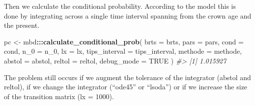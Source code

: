 \documentclass[]{article}
\newenvironment{Shaded}{\begin{snugshade}}{\end{snugshade}}
\newcommand{\CommentTok}[1]{\textcolor[rgb]{0.56,0.35,0.01}{\textit{#1}}}
\newcommand{\DataTypeTok}[1]{\textcolor[rgb]{0.13,0.29,0.53}{#1}}
\newcommand{\DecValTok}[1]{\textcolor[rgb]{0.00,0.00,0.81}{#1}}
\newcommand{\KeywordTok}[1]{\textcolor[rgb]{0.13,0.29,0.53}{\textbf{#1}}}
\newcommand{\NormalTok}[1]{#1}
\newcommand{\OperatorTok}[1]{\textcolor[rgb]{0.81,0.36,0.00}{\textbf{#1}}}
\newcommand{\OtherTok}[1]{\textcolor[rgb]{0.56,0.35,0.01}{#1}}
\newcommand{\StringTok}[1]{\textcolor[rgb]{0.31,0.60,0.02}{#1}}
\begin{document}
Then we calculate the conditional probability. According to the model this is
done by integrating across a single time interval spanning from the crown age
and the present.

\begin{Shaded}
\begin{Highlighting}[]
\NormalTok{pc <-}\StringTok{ }\NormalTok{mbd}\OperatorTok{:::}\KeywordTok{calculate_conditional_prob}\NormalTok{(}
  \DataTypeTok{brts =}\NormalTok{ brts,}
  \DataTypeTok{pars =}\NormalTok{ pars,}
  \DataTypeTok{cond =}\NormalTok{ cond,}
  \DataTypeTok{n_0 =}\NormalTok{ n_}\DecValTok{0}\NormalTok{,}
  \DataTypeTok{lx =}\NormalTok{ lx,}
  \DataTypeTok{tips_interval =}\NormalTok{ tips_interval,}
  \DataTypeTok{methode =}\NormalTok{ methode,}
  \DataTypeTok{abstol =}\NormalTok{ abstol,}
  \DataTypeTok{reltol =}\NormalTok{ reltol,}
  \DataTypeTok{debug_mode =} \OtherTok{TRUE}
\NormalTok{)}
\CommentTok{#> [1] 1.015927}
\end{Highlighting}
\end{Shaded}

The problem still occurs if we augment the tolerance of the integrator
(abstol and reltol), if we change the integrator (``ode45'' or ``lsoda'') or if we
increase the size of the transition matrix (lx = 1000).
\end{document}

